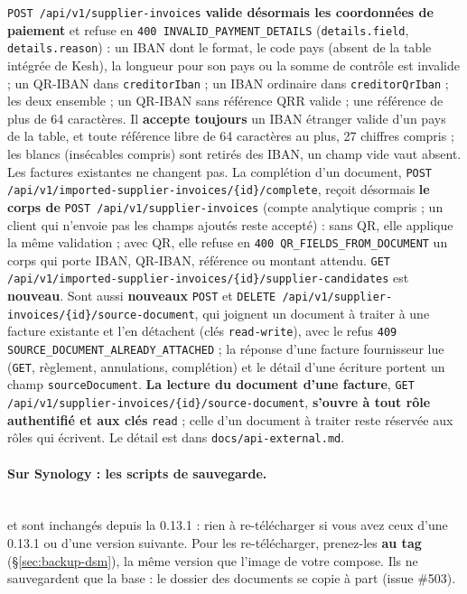 \documentclass[a4paper,11pt,oneside]{article}
\begin{document}
\begin{sloppypar}
\texttt{POST /api/v1/supplier-invoices} \textbf{valide désormais les coordonnées de paiement} et refuse en \texttt{400 INVALID\_PAYMENT\_DETAILS} (\texttt{details.field}, \texttt{details.reason}) : un IBAN dont le format, le code pays (absent de la table intégrée de Kesh), la longueur pour son pays ou la somme de contrôle est invalide ; un QR-IBAN dans \texttt{creditorIban} ; un IBAN ordinaire dans \texttt{creditorQrIban} ; les deux ensemble ; un QR-IBAN sans référence QRR valide ; une référence de plus de 64 caractères. Il \textbf{accepte toujours} un IBAN étranger valide d'un pays de la table, et toute référence libre de 64 caractères au plus, 27 chiffres compris ; les blancs (insécables compris) sont retirés des IBAN, un champ vide vaut absent. Les factures existantes ne changent pas. La complétion d'un document, \texttt{POST /api/v1/imported-supplier-invoices/\{id\}/complete}, reçoit désormais \textbf{le corps de} \texttt{POST /api/v1/supplier-invoices} (compte analytique compris ; un client qui n'envoie pas les champs ajoutés reste accepté) : sans QR, elle applique la même validation ; avec QR, elle refuse en \texttt{400 QR\_FIELDS\_FROM\_DOCUMENT} un corps qui porte IBAN, QR-IBAN, référence ou montant attendu. \texttt{GET /api/v1/imported-supplier-invoices/\{id\}/supplier-candidates} est \textbf{nouveau}. Sont aussi \textbf{nouveaux} \texttt{POST} et \texttt{DELETE /api/v1/supplier-invoices/\{id\}/source-document}, qui joignent un document à traiter à une facture existante et l'en détachent (clés \texttt{read-write}), avec le refus \texttt{409 SOURCE\_DOCUMENT\_ALREADY\_ATTACHED} ; la réponse d'une facture fournisseur lue (\texttt{GET}, règlement, annulations, complétion) et le détail d'une écriture portent un champ \texttt{sourceDocument}. \textbf{La lecture du document d'une facture}, \texttt{GET /api/v1/supplier-invoices/\{id\}/source-document}, \textbf{s'ouvre à tout rôle authentifié et aux clés} \texttt{read} ; celle d'un document à traiter reste réservée aux rôles qui écrivent. Le détail est dans \texttt{docs/api-external.md}.
\end{sloppypar}

\paragraph{Sur Synology : les scripts de sauvegarde.}\mbox{}\\
 et  sont inchangés depuis la 0.13.1 : rien à re-télécharger si vous avez ceux d'une 0.13.1 ou d'une version suivante. Pour les re-télécharger, prenez-les \textbf{au tag } (\S\ref{sec:backup-dsm}), la même version que l'image de votre compose. Ils ne sauvegardent que la base : le dossier des documents se copie à part (issue \#503).
\end{document}
